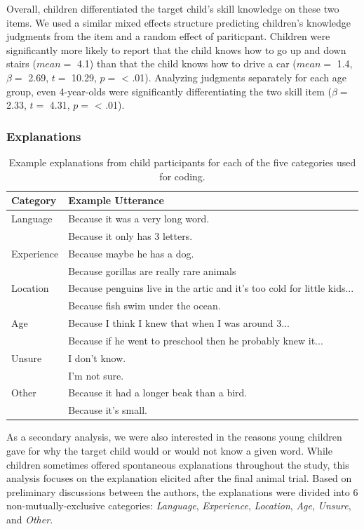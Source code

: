 \documentclass[10pt, letterpaper]{article}
\begin{document}
Overall, children differentiated the target child's skill knowledge on
these two items. We used a similar mixed effects structure predicting
children's knowledge judgments from the item and a random effect of
pariticpant. Children were significantly more likely to report that the
child knows how to go up and down stairs (\(mean =\) 4.1) than that the
child knows how to drive a car (\(mean =\) 1.4, \(\beta =\) 2.69,
\(t =\) 10.29, \(p =\) \textless{} .01). Analyzing judgments separately
for each age group, even 4-year-olds were significantly differentiating
the two skill item (\(\beta =\) 2.33, \(t =\) 4.31, \(p =\) \textless{}
.01).

\hypertarget{explanations}{%
\subsubsection{Explanations}\label{explanations}}

\begin{table}[tb]
\centering
\begin{tabular}{ll}
  \hline
Category & Example Utterance \\ 
  \hline
Language & Because it was a very long word. \\ 
    & Because it only has 3 letters. \\ 
  Experience & Because maybe he has a dog. \\ 
    & Because gorillas are really rare animals \\ 
  Location & Because penguins live in the artic and it's too cold for little kids... \\ 
    & Because fish swim under the ocean. \\ 
  Age & Because I think I knew that when I was around 3... \\ 
    & Because if he went to preschool then he probably knew it... \\ 
  Unsure & I don't know. \\ 
    & I'm not sure. \\ 
  Other & Because it had a longer beak than a bird. \\ 
    & Because it's small. \\ 
   \hline
\end{tabular}
\caption{Example explanations from child participants for each of the five categories used for coding.} 
\label{tab:explanations_table}
\end{table}

As a secondary analysis, we were also interested in the reasons young
children gave for why the target child would or would not know a given
word. While children sometimes offered spontaneous explanations
throughout the study, this analysis focuses on the explanation elicited
after the final animal trial. Based on preliminary discussions between
the authors, the explanations were divided into 6 non-mutually-exclusive
categories: \emph{Language}, \emph{Experience}, \emph{Location},
\emph{Age}, \emph{Unsure}, and \emph{Other}.
\end{document}
